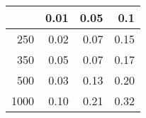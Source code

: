 % 
\begin{tabular}{rrrr}
  \hline
 & 0.01 & 0.05 & 0.1 \\ 
  \hline
250 & 0.02 & 0.07 & 0.15 \\ 
  350 & 0.05 & 0.07 & 0.17 \\ 
  500 & 0.03 & 0.13 & 0.20 \\ 
  1000 & 0.10 & 0.21 & 0.32 \\ 
   \hline
\end{tabular}
